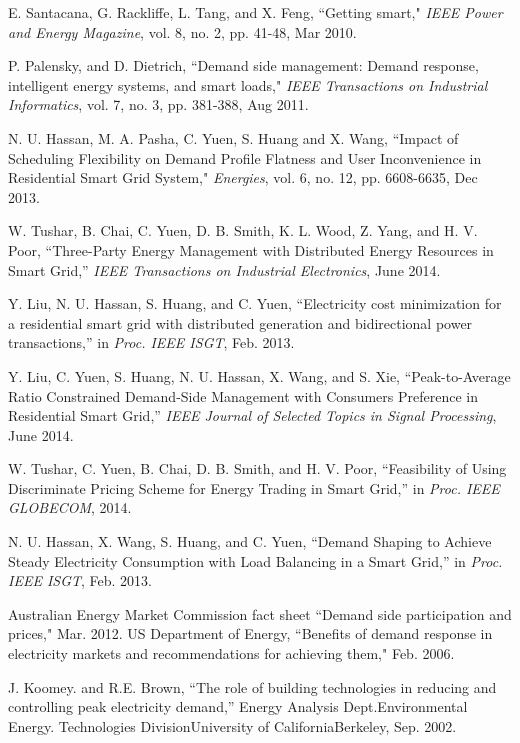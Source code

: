 \documentclass[10pt,twocolumn,twoside]{IEEEtran}
\begin{document}
\begin{thebibliography}{99}

 E. Santacana, G. Rackliffe, L. Tang, and X. Feng, ``Getting smart," \textit{IEEE Power and Energy Magazine}, vol. 8, no. 2, pp. 41-48, Mar 2010.

 P. Palensky, and D. Dietrich, ``Demand side management: Demand response, intelligent energy systems, and smart loads," \textit{IEEE Transactions on Industrial Informatics}, vol. 7, no. 3, pp. 381-388, Aug 2011.

 N. U. Hassan, M. A. Pasha, C. Yuen, S. Huang and X. Wang, ``Impact of Scheduling Flexibility on Demand Profile Flatness and User Inconvenience in Residential Smart Grid System," \textit{Energies}, vol. 6, no. 12, pp. 6608-6635, Dec 2013.

 W. Tushar, B. Chai, C. Yuen, D. B. Smith, K. L. Wood, Z. Yang, and H. V. Poor, ``Three-Party Energy Management with Distributed Energy Resources in Smart Grid,'' \textit{IEEE Transactions on Industrial Electronics}, June 2014.

 Y. Liu, N. U. Hassan, S. Huang, and C. Yuen, ``Electricity cost minimization for a residential smart grid with distributed generation and bidirectional power transactions,'' in \textit{Proc. IEEE ISGT}, Feb. 2013.

 Y. Liu, C. Yuen, S. Huang, N. U. Hassan, X. Wang, and S. Xie, ``Peak-to-Average Ratio Constrained Demand-Side Management with Consumers Preference in Residential Smart Grid,'' \textit{IEEE Journal of Selected Topics in Signal Processing}, June 2014.

 W. Tushar, C. Yuen, B. Chai, D. B. Smith, and H. V. Poor, ``Feasibility of Using Discriminate Pricing Scheme for Energy Trading in Smart Grid,'' in \textit{Proc. IEEE GLOBECOM}, 2014.


	N. U. Hassan, X. Wang, S. Huang, and C. Yuen, ``Demand Shaping to Achieve Steady Electricity Consumption with Load Balancing in a Smart Grid,'' in \textit{Proc. IEEE ISGT}, Feb. 2013.



 Australian Energy Market Commission fact sheet ``Demand side participation and prices," Mar. 2012.
 US Department of Energy, ``Benefits of demand response in electricity markets and recommendations for achieving them," Feb. 2006. 

 J. Koomey.  and  R.E. Brown, ``The role of building technologies in reducing and 
controlling peak electricity demand,''  Energy  Analysis  Dept.Environmental Energy. 
Technologies  DivisionUniversity  of  CaliforniaBerkeley, Sep. 2002. 


\end{thebibliography}
\end{document}

